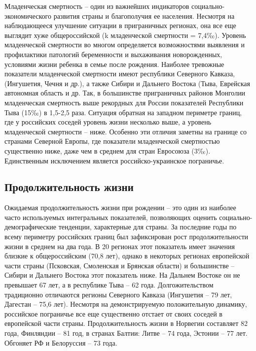 \documentclass[]{book}
\begin{document}
Младенческая смертность -- один из важнейших индикаторов
социально-экономического развития страны и благополучия ее населения.
Несмотря на наблюдающееся улучшение ситуации в приграничных регионах,
она все еще выглядит хуже общероссийской (k младенческой смертности =
7,4‰). Уровень младенческой смертности во многом определяется
возможностями выявления и профилактики патологий беременности и
выхаживания новорожденных, условиями жизни ребенка в семье после
рождения. Наиболее тревожные показатели младенческой смертности имеют
республики Северного Кавказа, (Ингушетия, Чечня и др.), а также Сибири и
Дальнего Востока (Тыва, Еврейская автономная область и др. Так, в
большинстве приграничных районов Монголии младенческая смертность выше
рекордных для России показателей Республики Тыва (15‰) в 1,5-2,5 раза.
Ситуация обратная на западном периметре границ, где у российских соседей
уровень жизни несколько выше, а уровень младенческой смертности -- ниже.
Особенно эти отличия заметны на границе со странами Северной Европы, где
показатели младенческой смертностью существенно ниже, даже чем в среднем
для стран Евросоюза (3‰). Единственным исключением является
российско-украинское пограничье.

\subsection{Продолжительность жизни}\label{demo-situ-long}

Ожидаемая продолжительность жизни при рождении -- это один из наиболее
часто используемых интегральных показателей, позволяющих оценить
социально-демографические тенденции, характерные для страны. За
последние годы по всему периметру российских границ был зафиксирован
рост продолжительности жизни в среднем на два года. В 20 регионах этот
показатель имеет значения близкие к общероссийским (70,8 лет), однако в
некоторых регионах европейской части страны (Псковская, Смоленская и
Брянская области) и большинстве -- Сибири и Дальнего Востока этот
показатель ниже. На Дальнем Востоке он не превышает 67 лет, а в
республике Тыва -- 62 года. Долгожительством традиционно отличаются
регионы Северного Кавказа (Ингушетия -- 79 лет, Дагестан -- 75,6 лет).
Несмотря на демонстрируемую положительную динамику, российское
пограничье все еще существенно отстает от своих соседей в европейской
части страны. Продолжительность жизни в Норвегии составляет 82 года,
Финляндии -- 81 год, в странах Балтии: Литве -- 74 года, Эстонии -- 77
лет. Обгоняет РФ и Белоруссия -- 73 года.
\end{document}
